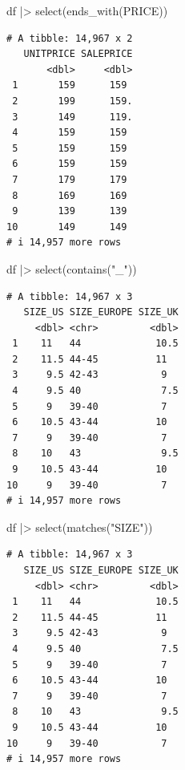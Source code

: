 \documentclass[
  letterpaper,
  DIV=11,
  numbers=noendperiod]{scrreprt}
\newenvironment{Shaded}{\begin{snugshade}}{\end{snugshade}}
\newcommand{\FunctionTok}[1]{\textcolor[rgb]{0.28,0.35,0.67}{#1}}
\newcommand{\NormalTok}[1]{\textcolor[rgb]{0.00,0.23,0.31}{#1}}
\newcommand{\SpecialCharTok}[1]{\textcolor[rgb]{0.37,0.37,0.37}{#1}}
\newcommand{\StringTok}[1]{\textcolor[rgb]{0.13,0.47,0.30}{#1}}
\begin{document}
\begin{Shaded}
\begin{Highlighting}[]
\NormalTok{df }\SpecialCharTok{|\textgreater{}}
    \FunctionTok{select}\NormalTok{(}\FunctionTok{ends\_with}\NormalTok{(}\StringTok{\textquotesingle{}PRICE\textquotesingle{}}\NormalTok{))}
\end{Highlighting}
\end{Shaded}

\begin{verbatim}
# A tibble: 14,967 x 2
   UNITPRICE SALEPRICE
       <dbl>     <dbl>
 1       159      159 
 2       199      159.
 3       149      119.
 4       159      159 
 5       159      159 
 6       159      159 
 7       179      179 
 8       169      169 
 9       139      139 
10       149      149 
# i 14,957 more rows
\end{verbatim}

\begin{Shaded}
\begin{Highlighting}[]
\NormalTok{df }\SpecialCharTok{|\textgreater{}}
    \FunctionTok{select}\NormalTok{(}\FunctionTok{contains}\NormalTok{(}\StringTok{"\_"}\NormalTok{))}
\end{Highlighting}
\end{Shaded}

\begin{verbatim}
# A tibble: 14,967 x 3
   SIZE_US SIZE_EUROPE SIZE_UK
     <dbl> <chr>         <dbl>
 1    11   44             10.5
 2    11.5 44-45          11  
 3     9.5 42-43           9  
 4     9.5 40              7.5
 5     9   39-40           7  
 6    10.5 43-44          10  
 7     9   39-40           7  
 8    10   43              9.5
 9    10.5 43-44          10  
10     9   39-40           7  
# i 14,957 more rows
\end{verbatim}

\begin{Shaded}
\begin{Highlighting}[]
\NormalTok{df }\SpecialCharTok{|\textgreater{}}
    \FunctionTok{select}\NormalTok{(}\FunctionTok{matches}\NormalTok{(}\StringTok{"SIZE"}\NormalTok{))}
\end{Highlighting}
\end{Shaded}

\begin{verbatim}
# A tibble: 14,967 x 3
   SIZE_US SIZE_EUROPE SIZE_UK
     <dbl> <chr>         <dbl>
 1    11   44             10.5
 2    11.5 44-45          11  
 3     9.5 42-43           9  
 4     9.5 40              7.5
 5     9   39-40           7  
 6    10.5 43-44          10  
 7     9   39-40           7  
 8    10   43              9.5
 9    10.5 43-44          10  
10     9   39-40           7  
# i 14,957 more rows
\end{verbatim}
\end{document}
